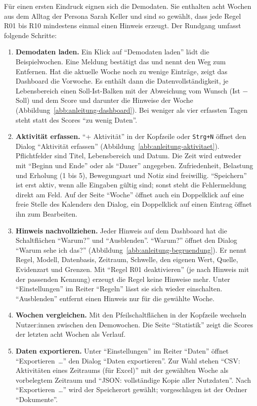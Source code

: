 Für einen ersten Eindruck eignen sich die Demodaten. Sie enthalten acht Wochen aus dem Alltag der Persona Sarah Keller und sind so gewählt, dass jede Regel R01 bis R10 mindestens einmal einen Hinweis erzeugt. Der Rundgang umfasst folgende Schritte:
\begin{enumerate}
  \item \textbf{Demodaten laden.} Ein Klick auf \enquote{Demodaten laden} lädt die Beispielwochen. Eine Meldung bestätigt das und nennt den Weg zum Entfernen. Hat die aktuelle Woche noch zu wenige Einträge, zeigt das Dashboard die Vorwoche. Es enthält dann die Datenvollständigkeit, je Lebensbereich einen Soll-Ist-Balken mit der Abweichung vom Wunsch (Ist − Soll) und dem Score und darunter die Hinweise der Woche (Abbildung~\ref{abb:anleitung-dashboard}). Bei weniger als vier erfassten Tagen steht statt des Scores \enquote{zu wenig Daten}.
  \item \textbf{Aktivität erfassen.} \enquote{+ Aktivität} in der Kopfzeile oder \texttt{Strg+N} öffnet den Dialog \enquote{Aktivität erfassen} (Abbildung~\ref{abb:anleitung-aktivitaet}). Pflichtfelder sind Titel, Lebensbereich und Datum. Die Zeit wird entweder mit \enquote{Beginn und Ende} oder als \enquote{Dauer} angegeben. Zufriedenheit, Belastung und Erholung (1 bis 5), Bewegungsart und Notiz sind freiwillig. \enquote{Speichern} ist erst aktiv, wenn alle Eingaben gültig sind; sonst steht die Fehlermeldung direkt am Feld. Auf der Seite \enquote{Woche} öffnet auch ein Doppelklick auf eine freie Stelle des Kalenders den Dialog, ein Doppelklick auf einen Eintrag öffnet ihn zum Bearbeiten.
  \item \textbf{Hinweis nachvollziehen.} Jeder Hinweis auf dem Dashboard hat die Schaltflächen \enquote{Warum?} und \enquote{Ausblenden}. \enquote{Warum?} öffnet den Dialog \enquote{Warum sehe ich das?} (Abbildung~\ref{abb:anleitung-begruendung}). Er nennt Regel, Modell, Datenbasis, Zeitraum, Schwelle, den eigenen Wert, Quelle, Evidenzart und Grenzen. Mit \enquote{Regel R01 deaktivieren} (je nach Hinweis mit der passenden Kennung) erzeugt die Regel keine Hinweise mehr. Unter \enquote{Einstellungen} im Reiter \enquote{Regeln} lässt sie sich wieder einschalten. \enquote{Ausblenden} entfernt einen Hinweis nur für die gewählte Woche.
  \item \textbf{Wochen vergleichen.} Mit den Pfeilschaltflächen in der Kopfzeile wechseln Nutzer:innen zwischen den Demowochen. Die Seite \enquote{Statistik} zeigt die Scores der letzten acht Wochen als Verlauf.
  \item \textbf{Daten exportieren.} Unter \enquote{Einstellungen} im Reiter \enquote{Daten} öffnet \enquote{Exportieren~…} den Dialog \enquote{Daten exportieren}. Zur Wahl stehen \enquote{CSV: Aktivitäten eines Zeitraums (für Excel)} mit der gewählten Woche als vorbelegtem Zeitraum und \enquote{JSON: vollständige Kopie aller Nutzdaten}. Nach \enquote{Exportieren~…} wird der Speicherort gewählt; vorgeschlagen ist der Ordner \enquote{Dokumente}.

\end{enumerate}
